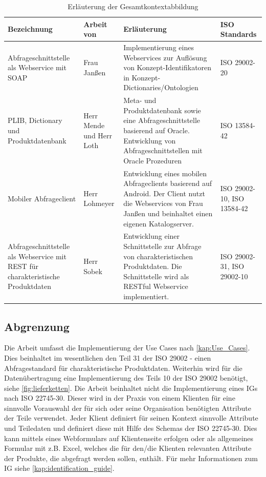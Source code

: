 \begin{table}[!hbt]\vspace{1ex}\centering
\scriptsize
\begin{tabular}{p{3cm}p{2.2cm}p{5cm}p{2.6cm}}
\toprule \rowcolor{mylightergray}
\textbf{Bezeichnung} & \textbf{Arbeit von} & \textbf{Erläuterung} &  \textbf{ISO Standards}\\
\midrule
Abfrageschnittstelle als \gls{Webservice} mit \gls{SOAP} &  Frau Janßen & Implementierung eines \glspl{Webservice} zur Auflösung von Konzept-Identifikatoren in Konzept-Dictionaries/Ontologien & ISO 29002-20 \\
\hline
PLIB, Dictionary und Produktdatenbank &  Herr Mende und Herr Loth & Meta- und Produktdatenbank sowie eine Abfrageschnittstelle basierend auf Oracle. Entwicklung von Abfrageschnittstellen mit Oracle Prozeduren & ISO 13584-42 \citep[Vergl.][]{iso13584-42}  \\
\hline
Mobiler Abfrageclient & Herr Lohmeyer & Entwicklung eines mobilen Abfrageclients basierend auf Android. Der Client nutzt die \glspl{Webservice} von Frau Janßen und beinhaltet einen eigenen Katalog\-server. & ISO 29002-10, ISO 13584-42 \\
\hline
Abfrageschnittstelle als \gls{Webservice} mit \gls{REST} für charakteristische Produktdaten & Herr Sobek & Entwicklung einer Schnittstelle zur Abfrage von charakteristischen Produktdaten. Die Schnittstelle wird als \gls{REST}ful \gls{Webservice} implementiert. & ISO 29002-31, ISO 29002-10 \\
\bottomrule
\end{tabular}
\caption{\label{tab.gesamtkontext}Erläuterung der Gesamtkontextabbildung}
\vspace{2ex}\end{table}

\subsection{Abgrenzung}   

Die Arbeit umfasst die Implementierung der Use Cases nach \autoref{kap:Use_Cases}. Dies beinhaltet im wesentlichen den Teil 31 der ISO 29002 - einen Abfragestandard für charakteristische Produktdaten. 
Weiterhin wird für die Datenübertragung eine Implementierung des Teils 10 der ISO 29002 benötigt, siehe \autoref{fig:lieferketten}. 
Die Arbeit beinhaltet nicht die Implementierung eines \glspl{IG} nach ISO 22745-30. Dieser wird in der Praxis von einem Klienten für eine sinnvolle Vorauswahl der für sich oder seine Organisation benötigten Attribute der Teile verwendet. Jeder Klient definiert für seinen Kontext sinnvolle Attribute und Teiledaten und definiert diese mit Hilfe des Schemas der ISO 22745-30. Dies kann mittels eines Webformulars auf Klientenseite erfolgen oder als allgemeines Formular mit z.B. \gls{Excel}, welches die für den/die Klienten relevanten Attribute der Produkte, die abgefragt werden sollen, enthält. Für mehr Informationen zum \gls{IG} siehe \autoref{kap:identification_guide}.

